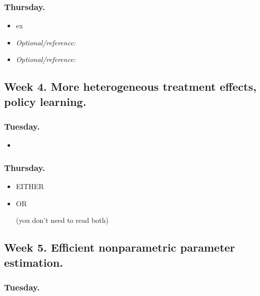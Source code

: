 \documentclass[letterpaper, 12pt, parskip=full,DIV=10]{scrartcl}
\begin{document}
\subsubsection*{Thursday.}

\begin{itemize}
\item {} ex
\item  \textit{Optional/reference:} 
\item \textit{Optional/reference:}  
\end{itemize}

\subsection*{Week 4. More heterogeneous treatment effects, policy learning.}

\subsubsection*{Tuesday.}


\begin{itemize}
\item {}
\end{itemize}


\subsubsection*{Thursday.}

\begin{itemize}
\item EITHER\\ 
\item OR\\ 

(you don't need to read both)
\end{itemize}


\subsection*{Week 5. Efficient nonparametric parameter estimation.}
\subsubsection*{Tuesday.}
\end{document}
